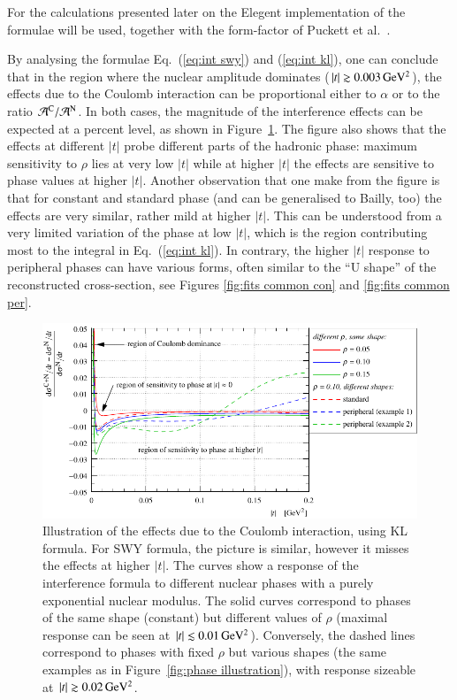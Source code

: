 For the calculations presented later on the Elegent implementation \cite{elegent} of the formulae will be used, together with the form-factor of Puckett et al.~\cite{puckett10}.

By analysing the formulae Eq.~(\ref{eq:int swy}) and (\ref{eq:int kl}), one can conclude that in the region where the nuclear amplitude dominates ($|t| \gtrsim 0.003\,{\rm GeV^2}$), the effects due to the Coulomb interaction can be proportional either to $\alpha$ or to the ratio ${\cal A}^{\rm C} / {\cal A}^{\rm N}$. In both cases, the magnitude of the interference effects can be expected at a percent level, as shown in Figure~\ref{fig:cni effect}. The figure also shows that the effects at different $|t|$ probe different parts of the hadronic phase: maximum sensitivity to $\rho$ lies at very low $|t|$ while at higher $|t|$ the effects are sensitive to phase values at higher $|t|$. Another observation that one make from the figure is that for constant and standard phase (and can be generalised to Bailly, too) the effects are very similar, rather mild at higher $|t|$. This can be understood from a very limited variation of the phase at low $|t|$, which is the region contributing most to the integral in Eq.~(\ref{eq:int kl}). In contrary, the higher $|t|$ response to peripheral phases can have various forms, often similar to the ``U shape'' of the reconstructed cross-section, see Figures \ref{fig:fits common con} and \ref{fig:fits common per}.



\begin{figure}
\begin{center}
\includegraphics{fig/cni_effect_illustration.pdf}
\caption{%
Illustration of the effects due to the Coulomb interaction, using KL formula. For SWY formula, the picture is similar, however it misses the effects at higher $|t|$. The curves show a response of the interference formula to different nuclear phases with a purely exponential nuclear modulus. The solid curves correspond to phases of the same shape (constant) but different values of $\rho$ (maximal response can be seen at $|t| \lesssim 0.01\,{\rm GeV^2}$). Conversely, the dashed lines correspond to phases with fixed $\rho$ but various shapes (the same examples as in Figure~\ref{fig:phase illustration}), with response sizeable at $|t| \gtrsim 0.02\,{\rm GeV^2}$.
}
\label{fig:cni effect}
\end{center}
\end{figure}

